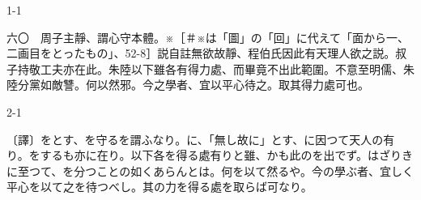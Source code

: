 \documentclass[tate,paper=b6j,jafontsize=9pt]{jlreq}
\begin{document}
\begin{azconvIndented}{1\zw}{-1\zw}

六〇　周子主靜、謂心守本體。※{\small ［＃※は「圖」の「回」に代えて「面から一、二画目をとったもの」、52-8］}説自註無欲故靜、程伯氏因此有天理人欲之説。叔子持敬工夫亦在此。朱陸以下雖各有得力處、而畢竟不出此範圍。不意至明儒、朱陸分黨如敵讐。何以然邪。今之學者、宜以平心待\azconvKunten{\azconvJR}之。取其得力處可也。

\end{azconvIndented}
\begin{azconvIndented}{2\zw}{-1\zw}

〔譯〕をとす、を守るを謂ふなり。に、「無し故に」とす、に因つて天人の有り。をするも亦に在り。以下各を得る處有りと雖、かも此のを出でず。はざりきに至つて、を分つことの如くあらんとは。何を以て然るや。今の學ぶ者、宜しく平心を以て之を待つべし。其の力を得る處を取らば可なり。

\end{azconvIndented}
\end{document}
